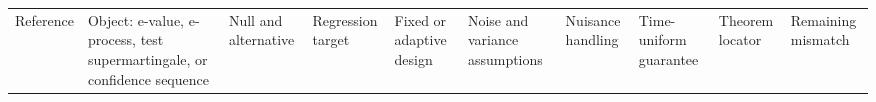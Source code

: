 \documentclass[
  english,
  11pt,
  a4paper,
]{article}
\newcounter{none} %
\begin{document}
{\def\LTcaptype{none} %
\begin{landscape}
\scriptsize
\begin{longtable}[]{@{}
  >{\raggedright\arraybackslash}p{}
  >{\raggedright\arraybackslash}p{}
  >{\raggedright\arraybackslash}p{}
  >{\raggedright\arraybackslash}p{}
  >{\raggedright\arraybackslash}p{}
  >{\raggedright\arraybackslash}p{}
  >{\raggedright\arraybackslash}p{}
  >{\raggedright\arraybackslash}p{}
  >{\raggedright\arraybackslash}p{}
  >{\raggedright\arraybackslash}p{}@{}}
\toprule\noalign{}
\begin{minipage}[b]{\linewidth}\raggedright
Reference
\end{minipage} & \begin{minipage}[b]{\linewidth}\raggedright
Object: e-value, e-process, test supermartingale, or confidence sequence
\end{minipage} & \begin{minipage}[b]{\linewidth}\raggedright
Null and alternative
\end{minipage} & \begin{minipage}[b]{\linewidth}\raggedright
Regression target
\end{minipage} & \begin{minipage}[b]{\linewidth}\raggedright
Fixed or adaptive design
\end{minipage} & \begin{minipage}[b]{\linewidth}\raggedright
Noise and variance assumptions
\end{minipage} & \begin{minipage}[b]{\linewidth}\raggedright
Nuisance handling
\end{minipage} & \begin{minipage}[b]{\linewidth}\raggedright
Time-uniform guarantee
\end{minipage} & \begin{minipage}[b]{\linewidth}\raggedright
Theorem locator
\end{minipage} & \begin{minipage}[b]{\linewidth}\raggedright
Remaining mismatch

\end{minipage}
\end{longtable}
\end{landscape}}
\end{document}
